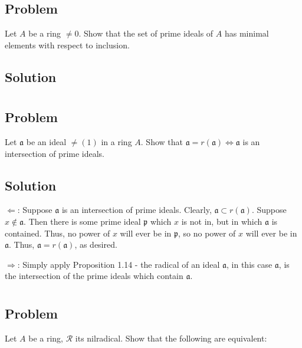 \documentclass[book,12pt,oneside,openany]{memoir}
\begin{document}
\section{}
\subsection{Problem}
Let $A$ be a ring $\neq 0$. Show that the set of prime ideals of $A$ has minimal elements with respect to inclusion.
\subsection{Solution}



\section{}
\subsection{Problem}
Let $\mathfrak{a}$ be an ideal $\neq (1)$ in a ring $A$. Show that $\mathfrak{a} = r(\mathfrak{a}) \Leftrightarrow \mathfrak{a}$ is an intersection of prime ideals.
\subsection{Solution}

$\Leftarrow$: Suppose $\mathfrak{a}$ is an intersection of prime ideals. Clearly, $\mathfrak{a} \subset r(\mathfrak{a})$. Suppose $x \notin \mathfrak{a}$. Then there is some prime ideal $\mathfrak{p}$ which $x$ is not in, but in which $\mathfrak{a}$ is contained. Thus, no power of $x$ will ever be in $\mathfrak{p}$, so no power of $x$ will ever be in $\mathfrak{a}$. Thus, $\mathfrak{a} = r(\mathfrak{a})$, as desired.

$\Rightarrow$:  Simply apply Proposition 1.14 - the radical of an ideal $\mathfrak{a}$, in this case $\mathfrak{a}$, is the intersection of the prime ideals which contain $\mathfrak{a}$.
\section{}
\subsection{Problem}
Let $A$ be a ring, $\mathcal{R}$ its nilradical. Show that the following are equivalent:
\end{document}

